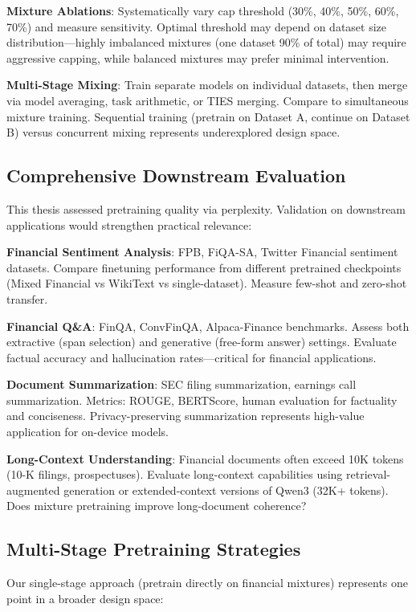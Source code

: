 \textbf{Mixture Ablations}: Systematically vary cap threshold (30\%, 40\%, 50\%, 60\%, 70\%) and measure sensitivity. Optimal threshold may depend on dataset size distribution—highly imbalanced mixtures (one dataset 90\% of total) may require aggressive capping, while balanced mixtures may prefer minimal intervention.

\textbf{Multi-Stage Mixing}: Train separate models on individual datasets, then merge via model averaging, task arithmetic, or TIES merging. Compare to simultaneous mixture training. Sequential training (pretrain on Dataset A, continue on Dataset B) versus concurrent mixing represents underexplored design space.

\subsection{Comprehensive Downstream Evaluation}

This thesis assessed pretraining quality via perplexity. Validation on downstream applications would strengthen practical relevance:

\textbf{Financial Sentiment Analysis}: FPB, FiQA-SA, Twitter Financial sentiment datasets. Compare finetuning performance from different pretrained checkpoints (Mixed Financial vs WikiText vs single-dataset). Measure few-shot and zero-shot transfer.

\textbf{Financial Q\&A}: FinQA, ConvFinQA, Alpaca-Finance benchmarks. Assess both extractive (span selection) and generative (free-form answer) settings. Evaluate factual accuracy and hallucination rates—critical for financial applications.

\textbf{Document Summarization}: SEC filing summarization, earnings call summarization. Metrics: ROUGE, BERTScore, human evaluation for factuality and conciseness. Privacy-preserving summarization represents high-value application for on-device models.

\textbf{Long-Context Understanding}: Financial documents often exceed 10K tokens (10-K filings, prospectuses). Evaluate long-context capabilities using retrieval-augmented generation or extended-context versions of Qwen3 (32K+ tokens). Does mixture pretraining improve long-document coherence?

\subsection{Multi-Stage Pretraining Strategies}

Our single-stage approach (pretrain directly on financial mixtures) represents one point in a broader design space:

